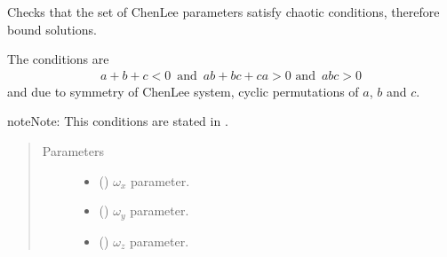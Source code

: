\documentclass[a4paper,landscape,10pt,english]{sphinxmanual}
\begin{document}
\begin{fulllineitems}
\label{\detokenize{code_docs/simulation_API.controller:simulation_API.controller.tasks._check_chen_lee_params}}
Checks that the set of Chen\sphinxhyphen{}Lee parameters satisfy chaotic conditions,
therefore bound solutions.

The conditions are
\begin{equation*}
\begin{split}a + b + c < 0 \,\text{ and }\, ab + bc + ca > 0 \text{ and }\, abc > 0\end{split}
\end{equation*}
and due to symmetry of Chen\sphinxhyphen{}Lee system, cyclic permutations of \(a\),
\(b\) and \(c\).

\begin{sphinxadmonition}{note}{Note:}
This conditions are stated in .
\end{sphinxadmonition}
\begin{quote}\begin{description}
\item[{Parameters}] \leavevmode\begin{itemize}
\item {} 
 () \textendash{} \(\omega_x\) parameter.

\item {} 
 () \textendash{} \(\omega_y\) parameter.

\item {} 
 () \textendash{} \(\omega_z\) parameter.

\end{itemize}

\end{description}\end{quote}

\end{fulllineitems}
\end{document}
